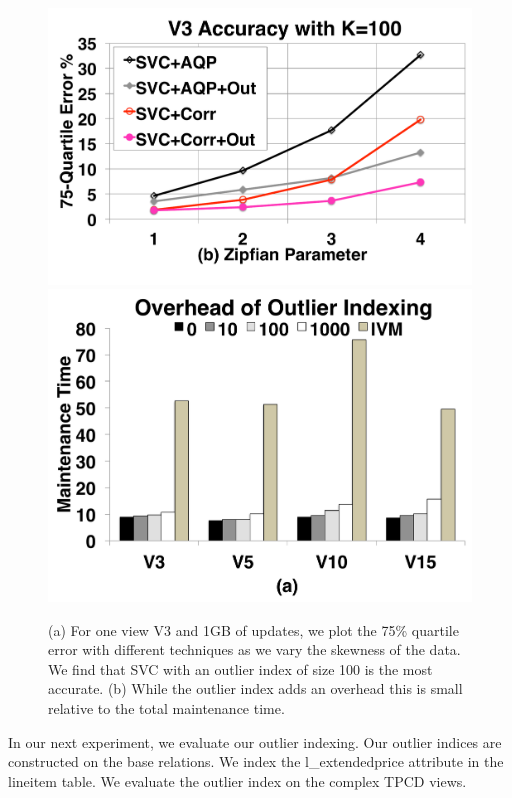 \begin{figure}[t]
\centering
 \includegraphics[scale=0.13]{exp/msoi_2.pdf}
 \includegraphics[scale=0.13]{exp/msoi_1.pdf}\vspace{-1em}
 \caption{(a) For one view V3 and 1GB of updates, we plot the 75\% quartile error with different techniques as we vary the skewness of the data. We find that SVC with an outlier index of size 100 is the most accurate. (b) While the outlier index adds an overhead this is small relative to the total maintenance time. \vspace{-1em}\label{exp5-oi}}
\end{figure}
In our next experiment, we evaluate our outlier indexing.
Our outlier indices are constructed on the base relations.
We index the \textsf{l\_extendedprice} attribute in the \textsf{lineitem} table.
We evaluate the outlier index on the complex TPCD views.

